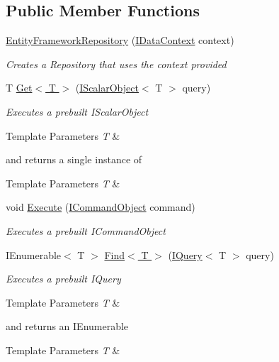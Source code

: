\subsection*{Public Member Functions}
\begin{DoxyCompactItemize}
\item 
\hyperlink{class_highway_1_1_data_1_1_entity_framework_1_1_repositories_1_1_entity_framework_repository_a9f5b6355d4a5054c37bcd19a6a444aca}{Entity\-Framework\-Repository} (\hyperlink{interface_highway_1_1_data_1_1_interfaces_1_1_i_data_context}{I\-Data\-Context} context)
\begin{DoxyCompactList}\small\item\em Creates a Repository that uses the context provided \end{DoxyCompactList}\item 
T \hyperlink{class_highway_1_1_data_1_1_entity_framework_1_1_repositories_1_1_entity_framework_repository_a96b10f64c2c73cdc8c19ceed3f97004d}{Get$<$ T $>$} (\hyperlink{interface_highway_1_1_data_1_1_interfaces_1_1_i_scalar_object-g}{I\-Scalar\-Object}$<$ T $>$ query)
\begin{DoxyCompactList}\small\item\em Executes a prebuilt I\-Scalar\-Object
\begin{DoxyTemplParams}{Template Parameters}
{\em T} & \\
\hline
\end{DoxyTemplParams}
and returns a single instance of 
\begin{DoxyTemplParams}{Template Parameters}
{\em T} & \\
\hline
\end{DoxyTemplParams}
\end{DoxyCompactList}\item 
void \hyperlink{class_highway_1_1_data_1_1_entity_framework_1_1_repositories_1_1_entity_framework_repository_a2cf1765e57f0e5527e2c36888eaf38f9}{Execute} (\hyperlink{interface_highway_1_1_data_1_1_interfaces_1_1_i_command_object}{I\-Command\-Object} command)
\begin{DoxyCompactList}\small\item\em Executes a prebuilt I\-Command\-Object \end{DoxyCompactList}\item 
I\-Enumerable$<$ T $>$ \hyperlink{class_highway_1_1_data_1_1_entity_framework_1_1_repositories_1_1_entity_framework_repository_af361e5a4bc1f44f9165cc450add06ece}{Find$<$ T $>$} (\hyperlink{interface_highway_1_1_data_1_1_interfaces_1_1_i_query-g}{I\-Query}$<$ T $>$ query)
\begin{DoxyCompactList}\small\item\em Executes a prebuilt I\-Query
\begin{DoxyTemplParams}{Template Parameters}
{\em T} & \\
\hline
\end{DoxyTemplParams}
and returns an I\-Enumerable
\begin{DoxyTemplParams}{Template Parameters}
{\em T} & \\
\hline
\end{DoxyTemplParams}
\end{DoxyCompactList}\end{DoxyCompactItemize}
